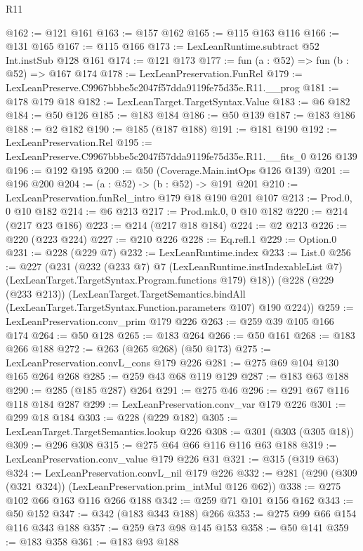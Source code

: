 \begin{lexlean}{R11}
\begin{coremodule}
@162 := @121 @161
@163 := @157 @162
@165 := @115 @163 @116
@166 := @131 @165
@167 := @115 @166
@173 := LexLeanRuntime.subtract @52 Int.instSub @128 @161
@174 := @121 @173
@177 := fun (a : @52) => fun (b : @52) => @167 @174
@178 := LexLeanPreservation.FunRel
@179 := LexLeanPreserve.C9967bbbe5c2047f57dda9119fe75d35e.R11.__prog
@181 := @178 @179 @18
@182 := LexLeanTarget.TargetSyntax.Value
@183 := @6 @182
@184 := @50 @126
@185 := @183 @184
@186 := @50 @139
@187 := @183 @186
@188 := @2 @182
@190 := @185 (@187 @188)
@191 := @181 @190
@192 := LexLeanPreservation.Rel
@195 := LexLeanPreserve.C9967bbbe5c2047f57dda9119fe75d35e.R11.__fits_0 @126 @139
@196 := @192 @195
@200 := @50 (Coverage.Main.intOps @126 @139)
@201 := @196 @200
@204 := (a : @52) -> (b : @52) -> @191 @201
@210 := LexLeanPreservation.funRel_intro @179 @18 @190 @201 @107
@213 := Prod.{0, 0} @10 @182
@214 := @6 @213
@217 := Prod.mk.{0, 0} @10 @182
@220 := @214 (@217 @23 @186)
@223 := @214 (@217 @18 @184)
@224 := @2 @213
@226 := @220 (@223 @224)
@227 := @210 @226
@228 := Eq.refl.{1}
@229 := Option.{0}
@231 := @228 (@229 @7)
@232 := LexLeanRuntime.index
@233 := List.{0}
@256 := @227
    (@231
      (@232
        (@233 @7)
        @7
        (LexLeanRuntime.instIndexableList @7)
        (LexLeanTarget.TargetSyntax.Program.functions @179)
        @18))
    (@228
      (@229 (@233 @213))
      (LexLeanTarget.TargetSemantics.bindAll
        (LexLeanTarget.TargetSyntax.Function.parameters @107)
        @190
        @224))
@259 := LexLeanPreservation.conv_prim @179 @226
@263 := @259 @39 @105 @166 @174
@264 := @50 @128
@265 := @183 @264
@266 := @50 @161
@268 := @183 @266 @188
@272 := @263 (@265 @268) (@50 @173)
@275 := LexLeanPreservation.convL_cons @179 @226
@281 := @275 @69 @104 @130 @165 @264 @268
@285 := @259 @43 @68 @119 @129
@287 := @183 @63 @188
@290 := @285 (@185 @287) @264
@291 := @275 @46
@296 := @291 @67 @116 @118 @184 @287
@299 := LexLeanPreservation.conv_var @179 @226
@301 := @299 @18 @184
@303 := @228 (@229 @182)
@305 := LexLeanTarget.TargetSemantics.lookup @226
@308 := @301 (@303 (@305 @18))
@309 := @296 @308
@315 := @275 @64 @66 @116 @116 @63 @188
@319 := LexLeanPreservation.conv_value @179 @226 @31
@321 := @315 (@319 @63)
@324 := LexLeanPreservation.convL_nil @179 @226
@332 := @281 (@290 (@309 (@321 @324)) (LexLeanPreservation.prim_intMul @126 @62))
@338 := @275 @102 @66 @163 @116 @266 @188
@342 := @259 @71 @101 @156 @162
@343 := @50 @152
@347 := @342 (@183 @343 @188) @266
@353 := @275 @99 @66 @154 @116 @343 @188
@357 := @259 @73 @98 @145 @153
@358 := @50 @141
@359 := @183 @358
@361 := @183 @93 @188

\end{coremodule}
\end{lexlean}

